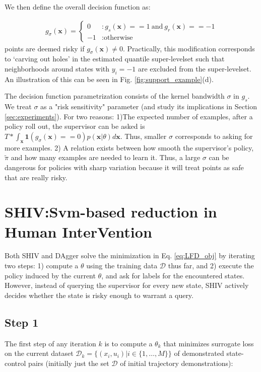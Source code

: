 \documentclass[10pt, conference]{ieeeconf}      %
\newcommand{\bx}{\mathbf{x}}
\begin{document}
We then define the overall decision function as:

\vspace{-2ex}
\begin{align}\label{eq:decision_func}
g_{\sigma}(\bx) = \left\{
     \begin{array}{ll}
         0 & : g_s(\bx) == 1 \: \mbox{and} \: g_r(\bx) == -1\\
         -1 & : \mbox{otherwise}
     \end{array}
   \right.
\end{align}
points are deemed risky if $g_{\sigma}(\bx) \neq 0$.  Practically, this modification corresponds to
`carving out holes' in the estimated quantile super-levelset such that neighborhoods around states with $y_i=-1$ are
excluded from the super-levelset. An illustration of this can be seen in Fig. \ref{fig:support_example}(d).


The decision function parametrization consists of the kernel bandwidth $\sigma$ in $g_s$. We treat $\sigma$ as a "risk sensitivity" parameter (and study its implications in Section \ref{sec:experiments}). For two reasons: 1)The expected number of examples, after a policy roll out, the supervisor can be asked is  $T*\int_\bx \mathbf{1}(g_{\sigma}(\bx) == 0) p(\bx|\theta)d\bx$. Thus, smaller $\sigma$ corresponds to asking for more examples. 2) A relation exists between how smooth the supervisor's policy, $\tilde{\pi}$ and how many examples are needed to learn it. Thus, a large $\sigma$ can be dangerous for policies with sharp variation because it will treat points as safe that are really risky. 

\section{SHIV:Svm-based reduction in Human InterVention} \label{sec:SHIV}

Both SHIV and DAgger \cite{ross2010reduction} solve the minimization in Eq. \ref{eq:LFD_obj} by iterating two steps: 1) compute a $\theta$ using the training data $\mathcal{D}$ thus far, and 2) execute the policy induced by the current $\theta$, and ask for labels for the encountered states. However, instead of querying the supervisor for every new state, SHIV actively decides whether the state is risky enough to warrant a query. 


\subsection{Step 1}
The first step of any iteration $k$ is to compute a $\theta_k$ that minimizes surrogate loss on the current dataset $\mathcal{D}_k=\{(x_i,u_i)|i\in\{1,\ldots,M\}\}$ of demonstrated state-control pairs (initially just the set $\mathcal{D}$ of initial trajectory demonstrations):
\end{document}
